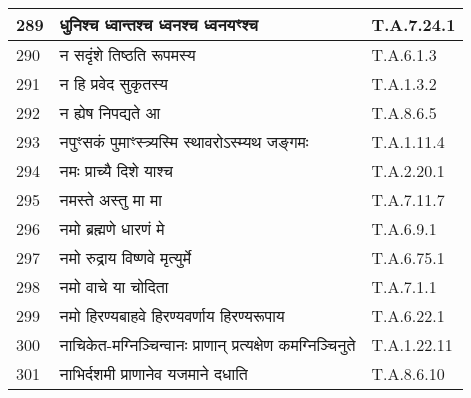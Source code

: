 \documentclass[17pt]{extarticle}
\begin{document}
\begin{longtable}{||p{0.4in}||p{4.9in}||p{0.9in}||}
    289 & धुनिश्च ध्वान्तश्च ध्वनश्च ध्वनयꣳश्च & T.A.7.24.1       \\
    
    \hline
        
    290 & न सदृंशे तिष्ठति रूपमस्य & T.A.6.1.3       \\
    
    \hline
        
    291 & न हि प्रवेद सुकृतस्य & T.A.1.3.2       \\
    
    \hline
        
    292 & न ह्येष निपद्यते आ & T.A.8.6.5       \\
    
    \hline
        
    293 & नपुꣳसकं पुमाꣳस्त्र्यस्मि स्थावरोऽस्म्यथ जङ्गमः & T.A.1.11.4       \\
    
    \hline
        
    294 & नमः प्राच्यै दिशे याश्च & T.A.2.20.1       \\
    
    \hline
        
    295 & नमस्ते अस्तु मा मा & T.A.7.11.7       \\
    
    \hline
        
    296 & नमो ब्रह्मणे धारणं मे & T.A.6.9.1       \\
    
    \hline
        
    297 & नमो रुद्राय विष्णवे मृत्युर्मे & T.A.6.75.1       \\
    
    \hline
        
    298 & नमो वाचे या चोदिता & T.A.7.1.1       \\
    
    \hline
        
    299 & नमो हिरण्यबाहवे हिरण्यवर्णाय हिरण्यरूपाय & T.A.6.22.1       \\
    
    \hline
        
    300 & नाचिकेत{-}मग्निञ्चिन्वानः प्राणान् प्रत्यक्षेण कमग्निञ्चिनुते & T.A.1.22.11       \\
    
    \hline
        
    301 & नाभिर्दशमी प्राणानेव यजमाने दधाति & T.A.8.6.10       \\
    

\end{longtable}
\end{document}
